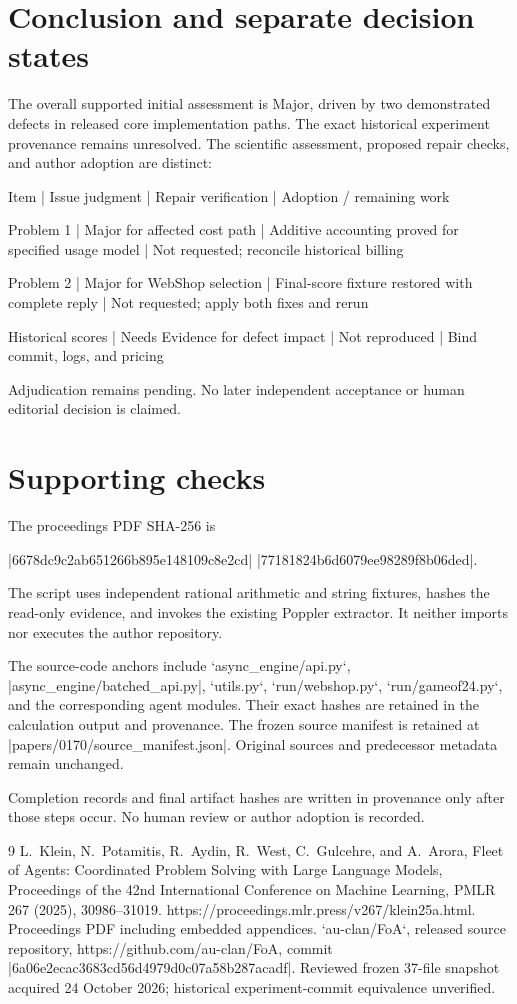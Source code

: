 \documentclass[10pt]{article}
\begin{document}
\section*{Conclusion and separate decision states}
The overall supported initial assessment is Major, driven by two demonstrated defects in released core implementation paths. The exact historical experiment provenance remains unresolved. The scientific assessment, proposed repair checks, and author adoption are distinct:\par
Item | Issue judgment | Repair verification | Adoption / remaining work\par
Problem 1 | Major for affected cost path | Additive accounting proved for specified usage model | Not requested; reconcile historical billing\par
Problem 2 | Major for WebShop selection | Final-score fixture restored with complete reply | Not requested; apply both fixes and rerun\par
Historical scores | Needs Evidence for defect impact | Not reproduced | Bind commit, logs, and pricing\par
Adjudication remains pending. No later independent acceptance or human editorial decision is claimed.\par
\section*{Supporting checks}
The proceedings PDF SHA-256 is\par
|6678dc9c2ab651266b895e148109c8e2cd|
|77181824b6d6079ee98289f8b06ded|.\par
The script uses independent rational arithmetic and string fixtures, hashes the read-only evidence, and invokes the existing Poppler extractor. It neither imports nor executes the author repository.\par
The source-code anchors include `async\_engine/api.py`, |async\_engine/batched\_api.py|, `utils.py`, `run/webshop.py`, `run/gameof24.py`, and the corresponding agent modules. Their exact hashes are retained in the calculation output and provenance. The frozen source manifest is retained at |papers/0170/source\_manifest.json|. Original sources and predecessor metadata remain unchanged.\par
Completion records and final artifact hashes are written in provenance only after those steps occur. No human review or author adoption is recorded.\par
9 L. Klein, N. Potamitis, R. Aydin, R. West, C. Gulcehre, and A. Arora, Fleet of Agents: Coordinated Problem Solving with Large Language Models, Proceedings of the 42nd International Conference on Machine Learning, PMLR 267 (2025), 30986–31019. https://proceedings.mlr.press/v267/klein25a.html. Proceedings PDF including embedded appendices. `au-clan/FoA`, released source repository, https://github.com/au-clan/FoA, commit |6a06e2ecac3683cd56d4979d0c07a58b287acadf|. Reviewed frozen 37-file snapshot acquired 24 October 2026; historical experiment-commit equivalence unverified.\par
\end{document}
